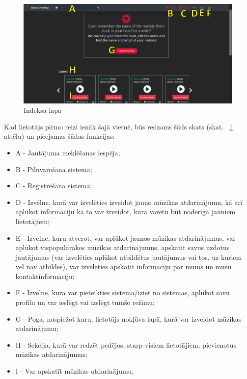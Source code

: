 \documentclass[12pt]{article}
\begin{document}
\begin{figure}[H]
\begin{center}
	\includegraphics[scale=0.6]{homepage.png}
	\caption{Indeksa lapa}
	\label{fig:homepage}
\end{center}
\end{figure}

Kad lietotājs pirmo reizi ienāk šajā vietnē, būs redzams šāds skats (skat. ~\ref{fig:homepage} attēlu) un pieejamas šādas funkcijas:

\begin{itemize}
	\item A - Jautājuma meklēšanas iespēja;
	\item B - Pilnvarošana sistēmā;
	\item C - Reģistrēšana sistēmā;
	\item D - Izvēlne, kurā var izvelēties izveidot jauno mūzikas atdarinājumu, kā arī aplūkot informāciju kā to var izveidot, kura varētu būt noderīgā jauniem lietotājiem;
	\item E - Izvelne, kuru atverot, var aplūkot jaunos mūzikas atdarinājumus, var aplūkot vispopulārākos mūzikas atdarinājumus, apskatīt savus uzdotus jautājumus (var izvelēties aplūkot atbildētus jautājumus vai tos, uz kuriem vēl nav atbildes), var izvelēties apskatīt informāciju par mums un mūsu kontaktinformāciju;
	\item F - Izvēlne, kurā var pieteikties sistēmā/iziet no sistēmas, aplūkot savu profilu un var ieslēgt vai izslēgt tumšo režīmu;
	\item G - Poga, nospiežot kuru, lietotājs nokļūva lapā, kurā var izveidot mūzikas atdarinājumu;
	\item H - Sekcija, kurā var redzēt pedējos, starp visiem lietotājiem, pievienotus mūzikas atdarinājumus;
	\item I - Var apskatīt mūzikas atdarinājumu.
\end{itemize}
\end{document}
